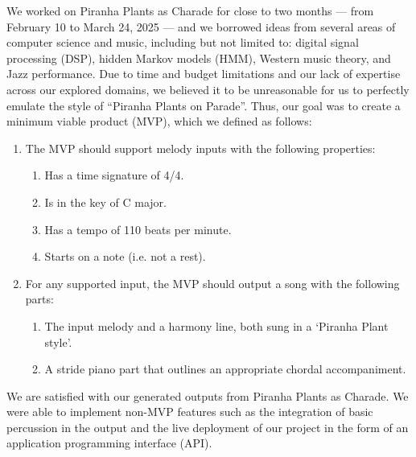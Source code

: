 We worked on Piranha Plants as Charade for close to two months --- from February 10 to March 24, 2025 --- and we borrowed ideas from several areas of computer science and music, including but not limited to: digital signal processing (DSP), hidden Markov models (HMM), Western music theory, and Jazz performance. Due to time and budget limitations and our lack of expertise across our explored domains, we believed it to be unreasonable for us to perfectly emulate the style of ``Piranha Plants on Parade''. Thus, our goal was to create a minimum viable product (MVP), which we defined as follows:
\begin{enumerate}
    \item The MVP should support melody inputs with the following properties:
    \begin{enumerate}
        \item Has a time signature of 4/4.
        \item Is in the key of C major.
        \item Has a tempo of 110 beats per minute.
        \item Starts on a note (i.e. not a rest).
    \end{enumerate}
    \item For any supported input, the MVP should output a song with the following parts:
    \begin{enumerate}
        \item The input melody and a harmony line, both sung in a `Piranha Plant style'.
        \item A stride piano part that outlines an appropriate chordal accompaniment.
    \end{enumerate}
\end{enumerate}
We are satisfied with our generated outputs from Piranha Plants as Charade. We were able to implement non-MVP features such as the integration of basic percussion in the output and the live deployment of our project in the form of an application programming interface (API).